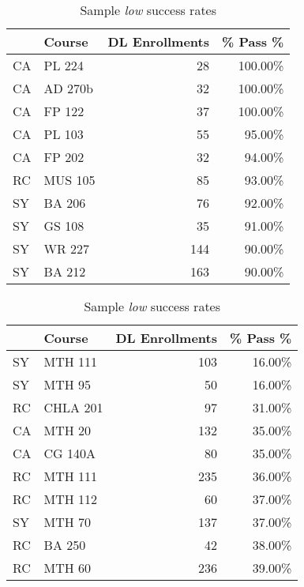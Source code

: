 \begin{table}[!htb]
	\begin{widepage}
	\begin{minipage}{.4\textwidth}
		\centering
		\caption{Sample \emph{high} success rates}
		\label{app:tab:highdlsuccess}
		\begin{tabular}{llrr}
			\toprule
			   & Course  & DL  Enrollments & \% Pass \% \\
			\midrule
			CA & PL 224  & 28              & 100.00\%   \\
			CA & AD 270b & 32              & 100.00\%   \\
			CA & FP 122  & 37              & 100.00\%   \\
			CA & PL 103  & 55              & 95.00\%    \\
			CA & FP 202  & 32              & 94.00\%    \\
			RC & MUS 105 & 85              & 93.00\%    \\
			SY & BA 206  & 76              & 92.00\%    \\
			SY & GS 108  & 35              & 91.00\%    \\
			SY & WR 227  & 144             & 90.00\%    \\
			SY & BA 212  & 163             & 90.00\%    \\
			\bottomrule
		\end{tabular}
	\end{minipage}%
	\hfill
	\begin{minipage}{.4\textwidth}
		\centering
		\caption{Sample \emph{low} success rates}
		\label{app:tab:lowdlsuccess}
		\begin{tabular}{llrr}
			\toprule
			   & Course   & DL Enrollments & \% Pass \% \\
			\midrule
			SY & MTH 111  & 103            & 16.00\%    \\  
			SY & MTH 95   & 50             & 16.00\%    \\  
			RC & CHLA 201 & 97             & 31.00\%    \\  
			CA & MTH 20   & 132            & 35.00\%    \\  
			CA & CG 140A  & 80             & 35.00\%    \\  
			RC & MTH 111  & 235            & 36.00\%    \\  
			RC & MTH 112  & 60             & 37.00\%    \\  
			SY & MTH 70   & 137            & 37.00\%    \\  
			RC & BA 250   & 42             & 38.00\%    \\  
			RC & MTH 60   & 236            & 39.00\%    \\  
			\bottomrule
		\end{tabular}
	\end{minipage}%
	\end{widepage}
\end{table}


